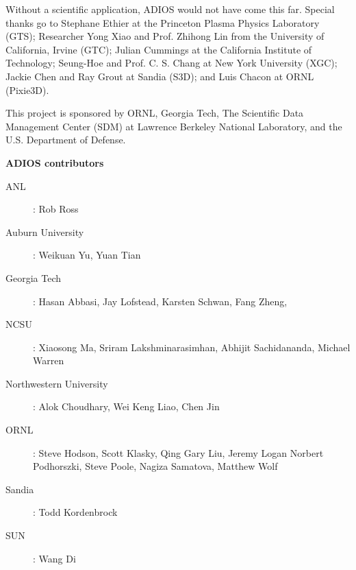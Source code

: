 \vspace{6pt}
Without a scientific application, ADIOS would not have come this far. Special thanks 
go to Stephane Ethier at the Princeton Plasma Physics Laboratory (GTS); Researcher 
Yong Xiao and Prof. Zhihong Lin from the University of California, Irvine (GTC); 
Julian Cummings at the California Institute of Technology; Seung-Hoe and Prof. 
C. S. Chang at New York University (XGC); Jackie Chen and Ray Grout at Sandia (S3D); 
and Luis Chacon at ORNL (Pixie3D). 

\vspace{6pt}
This project is sponsored by ORNL, Georgia Tech, The Scientific Data Management 
Center (SDM) at Lawrence Berkeley National Laboratory, and the U.S. Department 
of Defense. 

\vspace{6pt}
{\Large \textbf{ADIOS contributors}}

\vspace{6pt}
\begin{description}
\item[ANL]: Rob Ross
\item[Auburn University]: Weikuan Yu, Yuan Tian
\item[Georgia Tech]: Hasan Abbasi, Jay Lofstead, Karsten Schwan, Fang Zheng,
\item[NCSU]: Xiaosong Ma, Sriram Lakshminarasimhan, Abhijit Sachidananda, Michael Warren 
\item[Northwestern University]: Alok Choudhary, Wei Keng Liao, Chen Jin
\item[ORNL]: Steve Hodson, Scott Klasky, Qing Gary Liu, Jeremy Logan
Norbert Podhorszki, Steve Poole, Nagiza Samatova, Matthew Wolf
\item[Sandia]: Todd Kordenbrock
\item[SUN]: Wang Di
\end{description}

